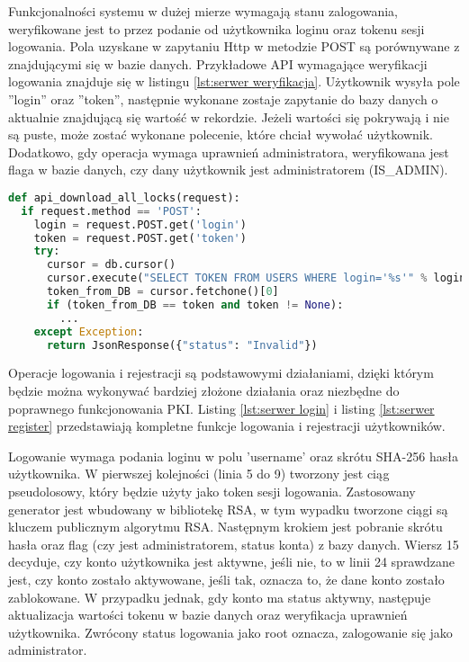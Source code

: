 	Funkcjonalności systemu w  dużej mierze wymagają stanu zalogowania, weryfikowane jest to przez podanie od użytkownika loginu oraz tokenu sesji logowania. Pola uzyskane w zapytaniu Http w metodzie POST są porównywane z znajdującymi się w bazie danych. Przykładowe API wymagające weryfikacji logowania znajduje się w listingu \ref{lst:serwer weryfikacja}. Użytkownik wysyła pole ''login'' oraz ''token'', następnie wykonane zostaje zapytanie do bazy danych o aktualnie znajdującą się wartość w rekordzie. Jeżeli wartości się pokrywają i nie są puste, może zostać wykonane polecenie, które chciał wywołać użytkownik. Dodatkowo, gdy operacja wymaga uprawnień administratora, weryfikowana jest flaga w bazie danych, czy dany użytkownik jest administratorem (IS\_ADMIN).
\newpage	
	{\footnotesize 
	\begin{lstlisting}[caption={Przykładowe API weryfikujące stan logowania}, label={lst:serwer weryfikacja}, language=Python]
def api_download_all_locks(request):
  if request.method == 'POST':
    login = request.POST.get('login')
    token = request.POST.get('token')
    try:
      cursor = db.cursor()
      cursor.execute("SELECT TOKEN FROM USERS WHERE login='%s'" % login)
      token_from_DB = cursor.fetchone()[0]
      if (token_from_DB == token and token != None):
        ...
    except Exception:
      return JsonResponse({"status": "Invalid"})
	\end{lstlisting}}
	
	Operacje logowania i rejestracji są podstawowymi działaniami, dzięki którym będzie można wykonywać bardziej złożone działania oraz niezbędne do poprawnego funkcjonowania PKI. Listing \ref{lst:serwer login} i listing \ref{lst:serwer register} przedstawiają kompletne funkcje logowania i rejestracji użytkowników. 
	
	Logowanie wymaga podania loginu w polu 'username' oraz skrótu \linebreak SHA-256 hasła użytkownika. W pierwszej kolejności (linia 5 do 9) tworzony jest ciąg pseudolosowy, który będzie użyty jako token sesji logowania. Zastosowany generator jest wbudowany w bibliotekę RSA, w tym wypadku tworzone ciągi są kluczem publicznym algorytmu RSA. Następnym krokiem jest pobranie skrótu hasła oraz flag (czy jest administratorem, status konta) z bazy danych. Wiersz 15 decyduje, czy konto użytkownika jest aktywne, jeśli nie, to w linii 24 sprawdzane jest, czy konto zostało aktywowane, jeśli tak, oznacza to, że dane konto zostało zablokowane. W przypadku jednak, gdy konto ma status aktywny, następuje aktualizacja wartości tokenu w bazie danych oraz weryfikacja uprawnień użytkownika. Zwrócony status logowania jako root oznacza, zalogowanie się jako administrator.
	
